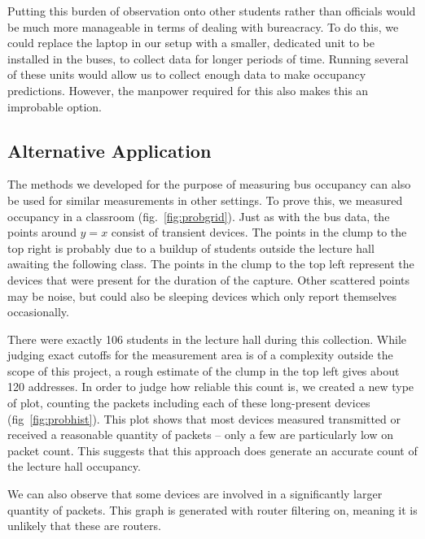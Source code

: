 Putting this burden of observation onto other students rather than officials would be much more manageable in terms of dealing with bureacracy.
To do this, we could replace the laptop in our setup with a smaller, dedicated unit to be installed in the buses, to collect data for longer periods of time.
Running several of these units would allow us to collect enough data to make occupancy predictions.
However, the manpower required for this also makes this an improbable option.

\subsection{Alternative Application}
The methods we developed for the purpose of measuring bus occupancy can also be used for similar measurements in other settings.
To prove this, we measured occupancy in a classroom (fig.~\ref{fig:probgrid}).
Just as with the bus data, the points around \(y=x\) consist of transient devices.
The points in the clump to the top right is probably due to a buildup of students outside the lecture hall awaiting the following class.
The points in the clump to the top left represent the devices that were present for the duration of the capture.
Other scattered points may be noise, but could also be sleeping devices which only report themselves occasionally.

There were exactly 106 students in the lecture hall during this collection.
While judging exact cutoffs for the measurement area is of a complexity outside the scope of this project, a rough estimate of the clump in the top left gives about 120 addresses.
In order to judge how reliable this count is, we created a new type of plot, counting the packets including each of these long-present devices (fig~\ref{fig:probhist}).
This plot shows that most devices measured transmitted or received a reasonable quantity of packets -- only a few are particularly low on packet count.
This suggests that this approach does generate an accurate count of the lecture hall occupancy.

We can also observe that some devices are involved in a significantly larger quantity of packets.
This graph is generated with router filtering on, meaning it is unlikely that these are routers.
